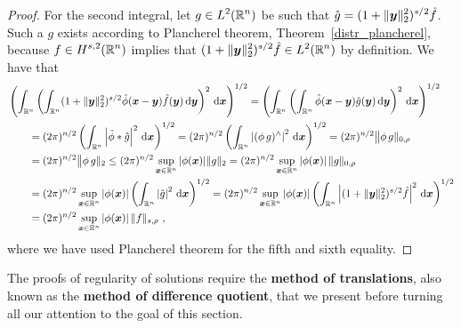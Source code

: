 \begin{proof}
For the second integral, let $\displaystyle g \in L^2(\mathbb{R}^n)$ be such that
$\displaystyle \hat{g} = (1 + \|{\bm{y}}\|_2^2)^{s/2} \hat{f}$.  Such a
$g$ exists according to Plancherel theorem, Theorem~\ref{distr_plancherel},
because $\displaystyle f \in H^{s,2}(\mathbb{R}^n)$ implies that
$\displaystyle (1 + \|{\bm{y}}\|_2^2)^{s/2} \hat{f} \in L^2(\mathbb{R}^n)$ by
definition.  We have that
\begin{align*}
&\left( \int_{\mathbb{R}^n} \left(
\int_{\mathbb{R}^n} (1 + \|{\bm{y}}\|_2^2)^{s/2} \hat{\phi}({\bm{x}}-{\bm{y}})
\hat{f}({\bm{y}}) \,\mathrm{d}{{\bm{y}}} \right)^2 \,\mathrm{d}{{\bm{x}}} \right)^{1/2}
= \left( \int_{\mathbb{R}^n} \left(
\int_{\mathbb{R}^n} \hat{\phi}({\bm{x}}-{\bm{y}}) \hat{g}({\bm{y}})
\,\mathrm{d}{{\bm{y}}} \right)^2 \,\mathrm{d}{{\bm{x}}} \right)^{1/2} \\
&\qquad = (2\pi)^{n/2} \left(\int_{\mathbb{R}^n}
\left|\hat{\phi} \ast \hat{g} \right|^2 \,\mathrm{d}{{\bm{x}}} \right)^{1/2}
= (2\pi)^{n/2}
\left(\int_{\mathbb{R}^n} \left|(\phi\, g)^\wedge \right|^2 \,\mathrm{d}{{\bm{x}}} \right)^{1/2}  
= (2\pi)^{n/2} \big\| \phi\,g\|_{0,\rho} \\
&\qquad
= (2\pi)^{n/2} \big\| \phi\,g\|_2
\leq (2\pi)^{n/2} \sup_{{\bm{x}}\in\mathbb{R}^n} |\phi({\bm{x}})| \|g\|_2
= (2\pi)^{n/2} \sup_{{\bm{x}}\in\mathbb{R}^n} |\phi({\bm{x}})|\, \|g\|_{0,\rho} \\
&\qquad = (2\pi)^{n/2} \sup_{{\bm{x}}\in\mathbb{R}^n} |\phi({\bm{x}})|
\left(\int_{\mathbb{R}^n} \left|\hat{g} \right|^2 \,\mathrm{d}{{\bm{x}}} \right)^{1/2}
= (2\pi)^{n/2} \sup_{{\bm{x}}\in\mathbb{R}^n} |\phi({\bm{x}})|
\left(\int_{\mathbb{R}^n}
\left|(1 + \|{\bm{y}}\|_2^2)^{s/2} \hat{f} \right|^2 \,\mathrm{d}{{\bm{x}}} \right)^{1/2} \\
&\qquad = (2\pi)^{n/2} \sup_{{\bm{x}}\in\mathbb{R}^n} |\phi({\bm{x}})|\, \|f\|_{s,\rho} \ ,
\end{align*}
where we have used Plancherel theorem for the fifth and sixth equality.
\end{proof}

The proofs of regularity of solutions require the
{\bfseries method of translations}, also
known as the
{\bfseries method of difference quotient},
that we present before turning all our attention to the goal of this section.

